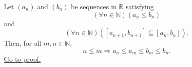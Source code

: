 \begin{lemma}
\label{lem:nested-closed-intervals-have-ordered-endpoints}
Let $(a_n)$ and $(b_n)$ be sequences in $\mathbb{R}$ satisfying
\[
  (\forall n\in\mathbb{N})(a_n\leq b_n)
\]
and
\[
  (\forall n\in\mathbb{N})([a_{n+1},b_{n+1}]\subseteq [a_n,b_n]).
\]
Then, for all $m,n\in\mathbb{N}$,
\[
  n\leq m
  \Longrightarrow
  a_n\leq a_m\leq b_m\leq b_n.
\]
\hyperref[prf:nested-closed-intervals-have-ordered-endpoints]{Go to proof.}
\end{lemma}